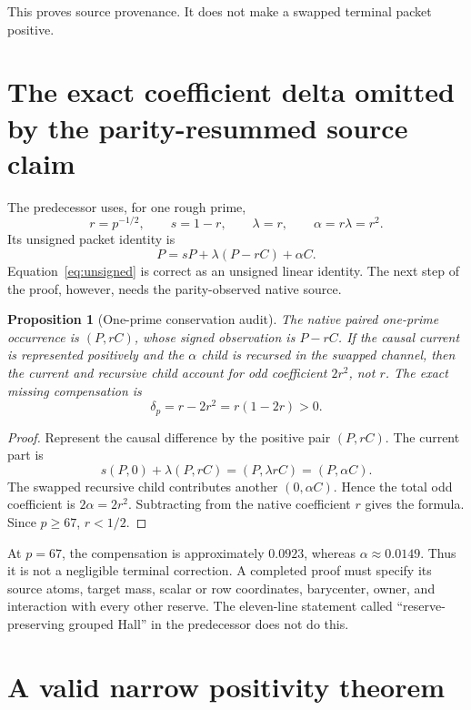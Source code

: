 \documentclass[11pt]{article}
\newtheorem{proposition}[theorem]{Proposition}
\newcommand{\1}{\mathbf 1}
\begin{document}
This proves source provenance.  It does not make a swapped terminal packet positive.

\section{The exact coefficient delta omitted by the parity-resummed source claim}

The predecessor uses, for one rough prime,
\[
r=p^{-1/2},\qquad s=1-r,\qquad \lambda=r,
\qquad\alpha=r\lambda=r^2.
\]
Its unsigned packet identity is
\begin{equation}\label{eq:unsigned}
P=sP+\lambda(P-rC)+\alpha C.
\end{equation}
Equation~\eqref{eq:unsigned} is correct as an unsigned linear identity.  The next step of the proof, however, needs the parity-observed native source.

\begin{proposition}[One-prime conservation audit]\label{prop:delta}
The native paired one-prime occurrence is $(P,rC)$, whose signed observation is $P-rC$.  If the causal current is represented positively and the $\alpha$ child is recursed in the swapped channel, then the current and recursive child account for odd coefficient $2r^2$, not $r$.  The exact missing compensation is
\[
\boxed{\delta_p=r-2r^2=r(1-2r)>0.}
\]
\end{proposition}
\begin{proof}
Represent the causal difference by the positive pair $(P,rC)$.  The current part is
\[
s(P,0)+\lambda(P,rC)=(P,\lambda rC)=(P,\alpha C).
\]
The swapped recursive child contributes another $(0,\alpha C)$.  Hence the total odd coefficient is $2\alpha=2r^2$.  Subtracting from the native coefficient $r$ gives the formula.  Since $p\ge67$, $r<1/2$.
\end{proof}

At $p=67$, the compensation is approximately $0.0923$, whereas $\alpha\approx0.0149$.  Thus it is not a negligible terminal correction.  A completed proof must specify its source atoms, target mass, scalar or row coordinates, barycenter, owner, and interaction with every other reserve.  The eleven-line statement called ``reserve-preserving grouped Hall'' in the predecessor does not do this.

\section{A valid narrow positivity theorem}
\end{document}
